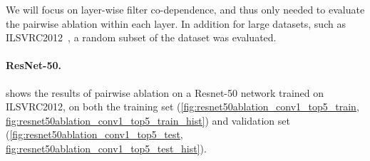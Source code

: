 \documentclass[thesis]{subfiles}
\begin{document}
We will focus on layer-wise filter co-dependence, and thus only needed to evaluate the pairwise ablation within each layer. In addition for large datasets, such as ILSVRC2012~\citep{ILSVRC2015}, a random subset of the dataset was evaluated.

\paragraph{ResNet-50.}
 shows the results of pairwise ablation on a Resnet-50 \citet{He2015} network trained on ILSVRC2012, on both the training set (\cref{fig:resnet50ablation_conv1_top5_train, fig:resnet50ablation_conv1_top5_train_hist}) and validation set (\cref{fig:resnet50ablation_conv1_top5_test, fig:resnet50ablation_conv1_top5_test_hist}).
\end{document}
